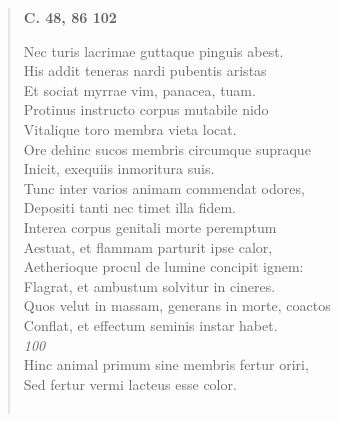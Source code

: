 \documentclass[11pt, a4paper]{report}
\begin{document}
\begin{verse}
    \begin{center} \textbf{C. 48, 86 102} \end{center} \marginpar{[24]} Nec turis lacrimae guttaque pinguis abest. \\ His addit teneras nardi pubentis aristas \\ Et sociat myrrae vim, panacea, tuam. \\ Protinus instructo corpus mutabile nido \\ Vitalique toro membra vieta locat. \\ Ore dehinc sucos membris circumque supraque \\ Inicit, exequiis inmoritura suis. \\ Tunc inter varios animam commendat odores, \\ Depositi tanti nec timet illa fidem. \\ Interea corpus genitali morte peremptum \\ Aestuat, et flammam parturit ipse calor, \\ Aetherioque procul de lumine concipit ignem: \\ Flagrat, et ambustum solvitur in cineres. \\ Quos velut in massam, generans in morte, coactos \\ Conflat, et effectum seminis instar habet. \\ \textit{100} \\ Hinc animal primum sine membris fertur oriri, \\ Sed fertur vermi lacteus esse color. \\ 
        ﻿\pagebreak 

\end{verse}
\end{document}
